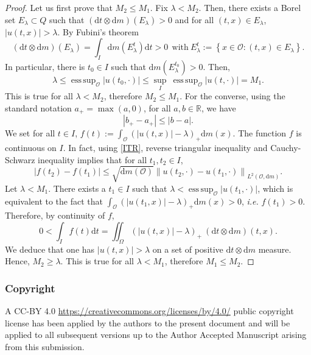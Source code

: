 \documentclass[12pt, letterpaper]{amsart}
\theoremstyle{definition}
\theoremstyle{remark}
\numberwithin{equation}{section}
\DeclareMathOperator*{\supess}{ess\,sup}
\begin{document}
\begin{proof}
Let us first prove that $M_2 \leq M_1$. Fix $\lambda < M_2$. Then, there exists a  Borel set $E_\lambda \subset Q$ such that $(\mathrm{d}t \otimes \mathrm{d}m)(E_\lambda)>0$ and for all $(t,x) \in E_\lambda$, $\left|u(t,x) \right| > \lambda.$ By Fubini's theorem $$(\mathrm{d}t \otimes \mathrm{d}m)(E_\lambda)= \int_I \mathrm{d}m (E_\lambda^t)\mathrm{d}t >0 \ \ \mathrm{with} \ E_\lambda^t := \left\{x \in \mathcal{O} : (t,x) \in E_\lambda \right\}.$$
In particular, there is  $t_0 \in I$ such that $\mathrm{d}m ({E^{t_0}_{\lambda}} ) >0$. Then, $$\lambda \leq \supess_{\mathcal{O}} \left|u(t_0,\cdot) \right| \leq \sup_{I} \ \supess_{\mathcal{O}} \left|u(t,\cdot) \right|=M_1.$$
This is true for all $\lambda < M_2$, therefore $M_2 \leq M_1$. For the converse, using the standard notation $a_+=\max(a,0)$,  for all $a,b\in \mathbb{R}$, we have
\begin{equation}\label{ITR}
    \left|b_+-a_+ \right|\leq \left|b-a \right|.
\end{equation}
We set for all $t\in I$, $f(t):= \int_\mathcal{O} (\left|u(t,x) \right|-\lambda )_+ \mathrm{d}m(x)$. The function $f$ is continuous on $I$. In fact, using \eqref{ITR}, reverse triangular inequality and Cauchy-Schwarz inequality implies that for all $t_1,t_2 \in I$,
\begin{equation*}
    \left|f(t_2)-f(t_1) \right| \leq \sqrt{\mathrm{d}m(\mathcal{O})} \left\|u(t_2,\cdot)-u(t_1,\cdot) \right\|_{L^2(\mathcal{O},\mathrm{d}m)}.
\end{equation*}
Let $\lambda < M_1$. There exists a $t_1 \in I$ such that $\lambda < \supess_{\mathcal{O}} \left|u(t_1,\cdot) \right| $, which is equivalent to the fact that $\int_\mathcal{O} (\left|u(t_1,x) \right|-\lambda )_+ \mathrm{d}m(x) >0$, \textit{i.e.} $f(t_1)>0$. Therefore, by continuity of $f$,
\begin{equation*}
    0 < \int_I f(t) \mathrm{d}t = \iint_{\Omega} (\left|u(t,x) \right|-\lambda )_+ \ (\mathrm{d}t \otimes\mathrm{d}m)(t,x).
\end{equation*}
We deduce that  one has $\left|u(t,x) \right| > \lambda $ on a set of positive $\mathrm{d}t \otimes\mathrm{d}m$ measure. Hence, $M_2 \geq \lambda$. This is true for all $\lambda < M_1$, therefore $M_1\le M_2$.
\end{proof}


\subsubsection*{\textbf{Copyright}}
A CC-BY 4.0 \url{https://creativecommons.org/licenses/by/4.0/} public copyright license has been applied by the authors to the present document and will be applied to all subsequent versions up to the Author Accepted Manuscript arising from this submission.





\end{document}
